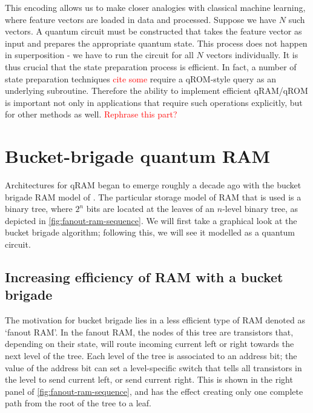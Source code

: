 \documentclass[a4paper,12pt]{article}
\newcommand\todo[1]{\textcolor{red}{#1}}
\begin{document}
This encoding allows us to make closer analogies with classical machine learning, where feature vectors are loaded in data and processed.
Suppose we have $N$ such vectors.
A quantum circuit must be constructed that takes the feature vector as input and prepares the appropriate quantum state.
This process does not happen in superposition - we have to run the circuit for all $N$ vectors individually.
It is thus crucial that the state preparation process is efficient.
In fact, a number of state preparation techniques \todo{cite some} require a qROM-style query as an underlying subroutine.
Therefore the ability to implement efficient qRAM/qROM is important not only in applications that require such operations explicitly, but for other methods as well.
\todo{Rephrase this part?}



\section{Bucket-brigade quantum RAM}
\label{sec:bb}

Architectures for qRAM began to emerge roughly a decade ago with the bucket brigade RAM model of \cite{Giovannetti2008, Giovannetti2008b}. 
The particular storage model of RAM that is used is a binary tree, where $2^n$ bits are located at the leaves of an $n$-level binary tree, as depicted in \autoref{fig:fanout-ram-sequence}. 
We will first take a graphical look at the bucket brigade algorithm; following this, we will see it modelled as a quantum circuit.

\subsection{Increasing efficiency of RAM with a bucket brigade}

The motivation for bucket brigade lies in a less efficient type of RAM denoted as `fanout RAM'. 
In the fanout RAM, the nodes of this tree are transistors that, depending on their state, will route incoming current left or right towards the next level of the tree. 
Each level of the tree is associated to an address bit; the value of the address bit can set a level-specific switch that tells all transistors in the level to send current left, or send current right. 
This is shown in the right panel of \autoref{fig:fanout-ram-sequence}, and has the effect creating only one complete path from the root of the tree to a leaf.
\end{document}
